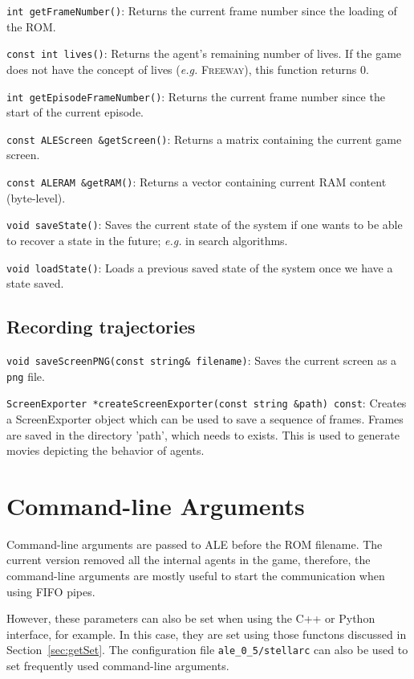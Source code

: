 \documentclass[12pt]{article}
\begin{document}
  \verb+int getFrameNumber()+: Returns the current frame number since the loading of the ROM.
  
  \verb+const int lives()+: Returns the agent's remaining number of lives. If the game does not have 
  the concept of lives (\emph{e.g.} \textsc{Freeway}), this function returns 0.
  
  \verb+int getEpisodeFrameNumber()+: Returns the current frame number since the start of the
  current episode.
  
  \verb+const ALEScreen &getScreen()+: Returns a matrix containing the current game screen.
  
  \verb+const ALERAM &getRAM()+: Returns a vector containing current RAM content (byte-level).
  
  \verb+void saveState()+: Saves the current state of the system if one wants to be able to recover 
  a state in the future; \emph{e.g.} in search algorithms.
  
  \verb+void loadState()+: Loads a previous saved state of the system once we have a state saved.

  \subsection{Recording trajectories}
   
  \indent \indent \verb+void saveScreenPNG(const string& filename)+: Saves the current screen as
  a \verb+png+ file.
  
  \verb+ScreenExporter *createScreenExporter(const string &path) const+: Creates a 
  ScreenExporter object which can be used to save a sequence of frames. Frames are saved 
  in the directory 'path', which needs to exists. This is used to generate movies depicting the behavior
  of agents.

\section{Command-line Arguments}\label{sec:arguments}

Command-line arguments are passed to ALE before the ROM filename. The current version removed all 
the internal agents in the game, therefore, the command-line arguments are mostly useful to start 
the communication when using FIFO pipes.

However, these parameters can also be set when using the C++ or Python interface, for example. In 
this case, they are set using those functons discussed in Section~\ref{sec:getSet}. The configuration file 
\verb+ale_0_5/stellarc+ can also be used to set frequently used command-line arguments.  
\end{document}
